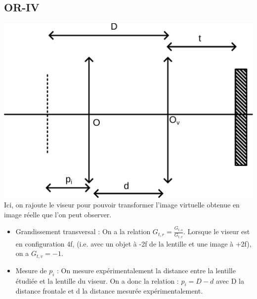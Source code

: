 \documentclass[french]{yLectureNote}
\begin{document}
\subsection{OR-IV}
\includegraphics[scale=0.25]{path2}
Ici, on rajoute le viseur pour pouvoir transformer l'image virtuelle obtenue en image réelle que l'on peut observer.
\begin{itemize}
 \item Grandissement transversal : On a la relation \(G_{t, r} = \frac{G_{t, o}}{G_{t, v}}\). Lorsque le viseur est en configuration 4f, (i.e. avec un objet à -2f de la lentille et une image à +2f), on a \(G_{t, v} = -1\).
 \item Mesure de \(p_i\) : On mesure expérimentalement la distance entre la lentille étudiée et la lentille du viseur. On a donc la relation : \(p_i = D-d\) avec D la distance frontale et d la distance mesurée expérimentalement.
\end{itemize}
\end{document}
